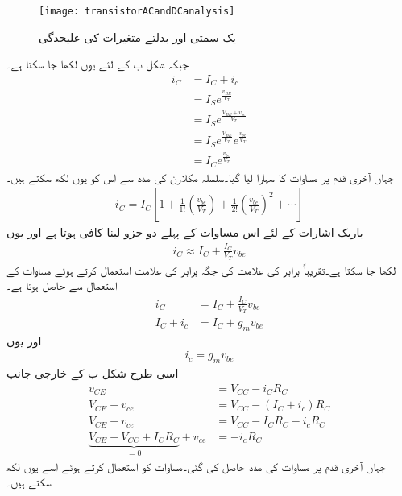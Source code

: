 \begin{figure}
\centering
\texttt{[image: transistorACandDCanalysis]}
\caption{یک سمتی اور بدلتے متغیرات کی علیحدگی}
\label{شکل_ٹرانزسٹر_یک_سمتی_اور_بدلتے_متغیرات_کی_علیحدگی}
\end{figure}
جبکہ شکل  ب کے لئے یوں لکھا جا سکتا ہے۔
\begin{align*}
i_C&=I_C+i_c\\
&=I_S e^{\frac{v_{BE}}{V_T}}\\
&=I_S e^{\frac{V_{BE}+v_{be}}{V_T}}\\
&=I_S e^{\frac{V_{BE}}{V_T}} e^{\frac{v_{be}}{V_T}}\\
&=I_C e^{\frac{v_{be}}{V_T}}
\end{align*}
جہاں آخری قدم پر مساوات   کا سہارا لیا گیا۔سلسلہ مکلارن کی مدد سے اس کو یوں لکھ سکتے ہیں۔
\begin{align*}
i_C = I_C \left [1+\frac{1}{1!}\left(\frac{v_{be}}{V_T} \right )+\frac{1}{2!}\left(\frac{v_{be}}{V_T}\right )^{2}+\cdots \right ]
\end{align*}
باریک اشارات کے لئے اس مساوات کے پہلے دو جزو لینا کافی ہوتا ہے اور یوں
\begin{align*}
i_C \approx I_C +\frac{I_C}{V_T}v_{be}
\end{align*}
لکھا جا سکتا ہے۔تقریباً برابر کی علامت  کی جگہ برابر کی علامت  استعمال کرتے ہوئے  مساوات   کے استعمال سے حاصل ہوتا ہے۔
\begin{align*}
i_C  & = I_C + \frac{I_C}{V_T} v_{be} \\
I_C+i_c &= I_C +g_m v_{be}
\end{align*}
اور یوں
\begin{align} \label{مساوات_ٹرانزسٹر_اشارہ_موجود_لہذا_بدلتی_رو}
i_c = g_m v_{be}
\end{align}
اسی طرح شکل  ب کے خارجی جانب
\begin{align*}
v_{CE} &=V_{CC}-i_C R_C \\
V_{CE}+v_{ce} &= V_{CC}-(I_C+i_c) R_C \\
V_{CE}+v_{ce} &=V_{CC}-I_C R_C -i_c R_C\\
\underbrace{V_{CE}-V_{CC}+I_C R_C}_{=0}+v_{ce} &=- i_c R_C
\end{align*}
جہاں آخری قدم پر مساوات  کی مدد حاصل کی گئی۔مساوات   کو استعمال کرتے ہوئے اسے  یوں لکھ سکتے ہیں۔

